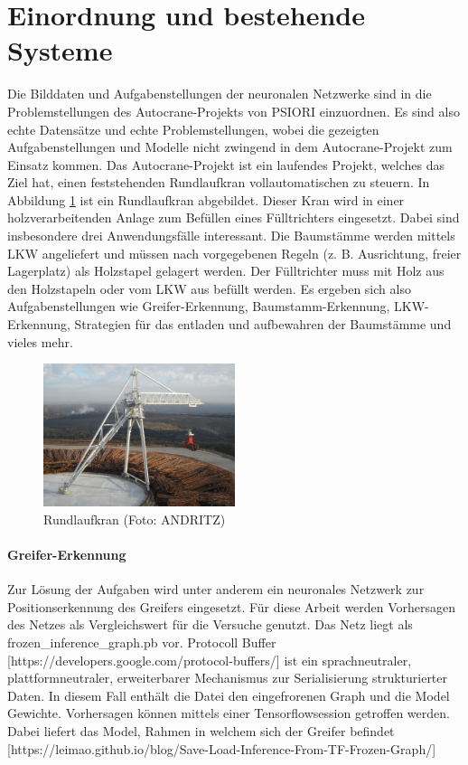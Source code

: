 	\section{Einordnung und bestehende Systeme}
	\label{sec:BestehendesSystem}
	Die Bilddaten und Aufgabenstellungen der neuronalen Netzwerke sind in die Problemstellungen des Autocrane-Projekts von PSIORI einzuordnen. Es sind also echte Datensätze und echte Problemstellungen, wobei die gezeigten Aufgabenstellungen und Modelle nicht zwingend in dem Autocrane-Projekt zum Einsatz kommen. Das Autocrane-Projekt ist ein laufendes Projekt, welches das Ziel hat, einen feststehenden Rundlaufkran vollautomatischen zu steuern. In Abbildung \ref{img:CircularCrane} ist ein Rundlaufkran abgebildet. Dieser Kran wird in einer holzverarbeitenden Anlage zum Befüllen eines Fülltrichters eingesetzt. Dabei sind insbesondere drei Anwendungsfälle interessant. Die Baumstämme werden mittels LKW angeliefert und müssen nach vorgegebenen Regeln (z. B. Ausrichtung, freier Lagerplatz) als Holzstapel gelagert werden. Der Fülltrichter muss mit Holz aus den Holzstapeln oder vom LKW aus befüllt werden. Es ergeben sich also Aufgabenstellungen wie Greifer-Erkennung, Baumstamm-Erkennung, LKW-Erkennung, Strategien für das entladen und aufbewahren der Baumstämme und vieles mehr. \cite{PSIORIGmbH.2020}
	\begin{figure}[h]
		\centering
		\includegraphics[width=0.5\textwidth, center]{bilder/Grundlagen/Kran_vollstaendig_N1_030.jpg}
		\caption[Rund-Kran]{Rundlaufkran (Foto: ANDRITZ)}
		\label{img:CircularCrane}
	\end{figure}		

	\paragraph{Greifer-Erkennung} 
Zur Lösung der Aufgaben wird unter anderem ein neuronales Netzwerk zur Positionserkennung des Greifers eingesetzt. Für diese Arbeit werden Vorhersagen des Netzes als Vergleichswert für die Versuche genutzt. Das Netz liegt als frozen\_inference\_graph.pb vor. Protocoll Buffer  [https://developers.google.com/protocol-buffers/] ist ein sprachneutraler, plattformneutraler, erweiterbarer Mechanismus zur Serialisierung strukturierter Daten. In diesem Fall enthält die Datei den eingefrorenen Graph und die Model Gewichte. Vorhersagen können mittels einer Tensorflowsession getroffen werden. Dabei liefert das Model, Rahmen in welchem sich der Greifer befindet 	[https://leimao.github.io/blog/Save-Load-Inference-From-TF-Frozen-Graph/]
		
